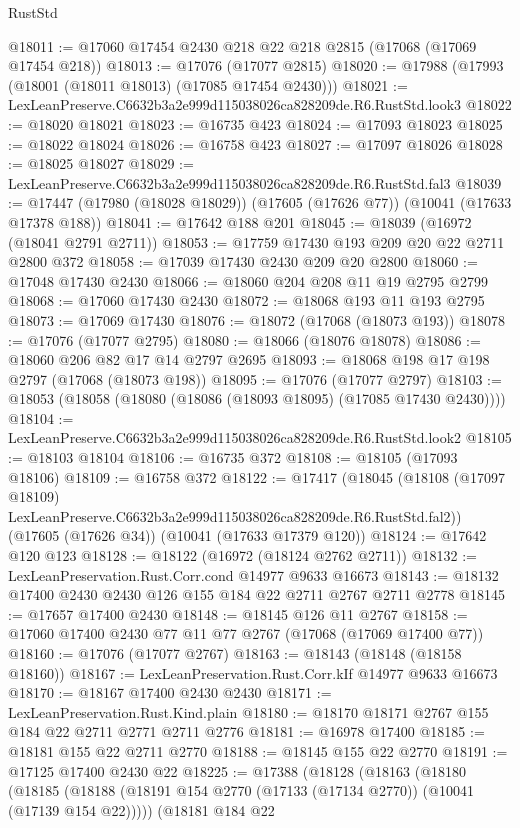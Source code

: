 \begin{lexlean}{RustStd}
\begin{coremodule}
@18011 := @17060 @17454 @2430 @218 @22 @218 @2815 (@17068 (@17069 @17454 @218))
@18013 := @17076 (@17077 @2815)
@18020 := @17988 (@17993 (@18001 (@18011 @18013) (@17085 @17454 @2430)))
@18021 := LexLeanPreserve.C6632b3a2e999d115038026ca828209de.R6.RustStd.look3
@18022 := @18020 @18021
@18023 := @16735 @423
@18024 := @17093 @18023
@18025 := @18022 @18024
@18026 := @16758 @423
@18027 := @17097 @18026
@18028 := @18025 @18027
@18029 := LexLeanPreserve.C6632b3a2e999d115038026ca828209de.R6.RustStd.fal3
@18039 := @17447 (@17980 (@18028 @18029)) (@17605 (@17626 @77)) (@10041 (@17633 @17378 @188))
@18041 := @17642 @188 @201
@18045 := @18039 (@16972 (@18041 @2791 @2711))
@18053 := @17759 @17430 @193 @209 @20 @22 @2711 @2800 @372
@18058 := @17039 @17430 @2430 @209 @20 @2800
@18060 := @17048 @17430 @2430
@18066 := @18060 @204 @208 @11 @19 @2795 @2799
@18068 := @17060 @17430 @2430
@18072 := @18068 @193 @11 @193 @2795
@18073 := @17069 @17430
@18076 := @18072 (@17068 (@18073 @193))
@18078 := @17076 (@17077 @2795)
@18080 := @18066 (@18076 @18078)
@18086 := @18060 @206 @82 @17 @14 @2797 @2695
@18093 := @18068 @198 @17 @198 @2797 (@17068 (@18073 @198))
@18095 := @17076 (@17077 @2797)
@18103 := @18053 (@18058 (@18080 (@18086 (@18093 @18095) (@17085 @17430 @2430))))
@18104 := LexLeanPreserve.C6632b3a2e999d115038026ca828209de.R6.RustStd.look2
@18105 := @18103 @18104
@18106 := @16735 @372
@18108 := @18105 (@17093 @18106)
@18109 := @16758 @372
@18122 := @17417
    (@18045
      (@18108 (@17097 @18109) LexLeanPreserve.C6632b3a2e999d115038026ca828209de.R6.RustStd.fal2))
    (@17605 (@17626 @34))
    (@10041 (@17633 @17379 @120))
@18124 := @17642 @120 @123
@18128 := @18122 (@16972 (@18124 @2762 @2711))
@18132 := LexLeanPreservation.Rust.Corr.cond @14977 @9633 @16673
@18143 := @18132 @17400 @2430 @2430 @126 @155 @184 @22 @2711 @2767 @2711 @2778
@18145 := @17657 @17400 @2430
@18148 := @18145 @126 @11 @2767
@18158 := @17060 @17400 @2430 @77 @11 @77 @2767 (@17068 (@17069 @17400 @77))
@18160 := @17076 (@17077 @2767)
@18163 := @18143 (@18148 (@18158 @18160))
@18167 := LexLeanPreservation.Rust.Corr.kIf @14977 @9633 @16673
@18170 := @18167 @17400 @2430 @2430
@18171 := LexLeanPreservation.Rust.Kind.plain
@18180 := @18170 @18171 @2767 @155 @184 @22 @2711 @2771 @2711 @2776
@18181 := @16978 @17400
@18185 := @18181 @155 @22 @2711 @2770
@18188 := @18145 @155 @22 @2770
@18191 := @17125 @17400 @2430 @22
@18225 := @17388
    (@18128
      (@18163
        (@18180
          (@18185 (@18188 (@18191 @154 @2770 (@17133 (@17134 @2770)) (@10041 (@17139 @154 @22)))))
          (@18181
            @184
            @22

\end{coremodule}
\end{lexlean}
